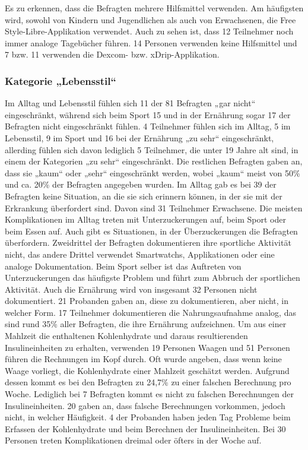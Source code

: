\documentclass[a4paper,11pt]{article}%
\renewcommand{\\}{\vspace*{0.5\baselineskip} \newline}
\begin{document}
	Es zu erkennen, dass die Befragten mehrere Hilfsmittel verwenden. Am häufigsten wird, sowohl von Kindern und Jugendlichen als auch von Erwachsenen, die Free Style-Libre-Applikation verwendet. Auch zu sehen ist, dass 12 Teilnehmer noch immer analoge Tagebücher führen. 14 Personen verwenden keine Hilfsmittel und 7 bzw. 11 verwenden die Dexcom- bzw. xDrip-Applikation.
\subsubsection{Kategorie „Lebensstil“}
	Im Alltag und Lebensstil fühlen sich 11 der 81 Befragten „gar nicht“ eingeschränkt, während sich beim Sport 15 und in der Ernährung sogar 17 der Befragten nicht eingeschränkt fühlen. 4 Teilnehmer fühlen sich im Alltag, 5 im Lebensstil, 9 im Sport und 16 bei der Ernährung „zu sehr“ eingeschränkt, allerding fühlen sich davon lediglich 5 Teilnehmer, die unter 19 Jahre alt sind, in einem der Kategorien „zu sehr“ eingeschränkt. Die restlichen Befragten gaben an, dass sie „kaum“ oder „sehr“ eingeschränkt werden, wobei „kaum“ meist von 50\% und ca. 20\% der Befragten angegeben wurden.\newline
	Im Alltag gab es bei 39 der Befragten keine Situation, an die sie sich erinnern können, in der sie mit der Erkrankung überfordert sind. Davon sind 31 Teilnehmer Erwachsene. Die meisten Komplikationen im Alltag treten mit Unterzuckerungen auf, beim Sport oder beim Essen auf. Auch gibt es Situationen, in der Überzuckerungen die Befragten überfordern.\newline
	Zweidrittel der Befragten dokumentieren ihre sportliche Aktivität nicht, das andere Drittel verwendet Smartwatchs, Applikationen oder eine analoge Dokumentation. Beim Sport selber ist das Auftreten von Unterzuckerungen das häufigste Problem und führt zum Abbruch der sportlichen Aktivität.\newline
	Auch die Ernährung wird von insgesamt 32 Personen nicht dokumentiert. 21 Probanden gaben an, diese zu dokumentieren, aber nicht, in welcher Form. 17 Teilnehmer dokumentieren die Nahrungsaufnahme analog, das sind rund 35\% aller Befragten, die ihre Ernährung aufzeichnen.\newline
	Um aus einer Mahlzeit die enthaltenen Kohlenhydrate und daraus resultierenden Insulineinheiten zu erhalten, verwenden 19 Personen Waagen und 51 Personen führen die Rechnungen im Kopf durch. Oft wurde angeben, dass wenn keine Waage vorliegt, die Kohlenhydrate einer Mahlzeit geschätzt werden. Aufgrund dessen kommt es bei den Befragten zu 24,7\% zu einer falschen Berechnung pro Woche. Lediglich bei 7 Befragten kommt es nicht zu falschen Berechnungen der Insulineinheiten. 20 gaben an, dass falsche Berechnungen vorkommen, jedoch nicht, in welcher Häufigkeit. 4 der Probanden haben jeden Tag Probleme beim Erfassen der Kohlenhydrate und beim Berechnen der Insulineinheiten. Bei 30 Personen treten Komplikationen dreimal oder öfters in der Woche auf.
\end{document}
